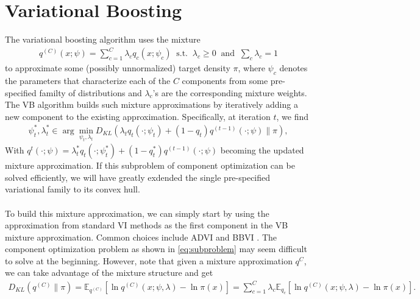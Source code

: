 

\section{Variational Boosting}\label{sec:vb}
The variational boosting algorithm uses the mixture
\begin{align*}
q^{(C)}(x;\psi) = \sum_{c=1}^C \lambda_c q_c(x; \psi_c) \ \text{ s.t. } \ \lambda_c \geq 0 \ \text{ and } \ \sum_{c}\lambda_c = 1
\end{align*}
to approximate some (possibly unnormalized) target density $\pi$, where $\psi_c$ denotes the parameters that characterize each of the $C$ components from some pre-specified familty of distributions and $\lambda_c$'s are the corresponding mixture weights. The VB algorithm builds such mixture approximations by iteratively adding a new component to the existing approximation. Specifically, at iteration $t$, we find
\begin{align}
\psi_t^*, \lambda_t^* \in \arg\min_{\psi_t, \lambda_t} D_{KL} \left( \lambda_t q_t(\cdot;\psi_t) + (1-q_t)q^{(t-1)}(\cdot;\psi) \| \pi \right),
\label{eq:subproblem}
\end{align}
With $q^{t}(\cdot;\psi) = \lambda_t^* q_t(\cdot;\psi_t^*) + (1-q_t^*)q^{(t-1)}(\cdot;\psi)$ becoming the updated mixture approximation. If this subproblem of component optimization can be solved efficiently, we will have greatly exdended the single pre-specified variational family to its convex hull.\\\\
To build this mixture approximation, we can simply start by using the approximation from standard VI methods as the first component in the VB mixture approximation. Common choices include ADVI and BBVI \cite{ranganath2014black,kucukelbir2017automatic}. The component optimization problem as shown in \cref{eq:subproblem} may seem difficult to solve at the beginning. However, note that given a mixture approximation $q^{C}$, we can take advantage of the mixture structure and get
\begin{align}\label{eq:component.wise}
D_{KL} \left( q^{(C)} \| \pi \right) = \mathbb{E}_{q^{(C)}} \left[ \ln q^{(C)}(x;\psi,\lambda) - \ln\pi(x) \right] = \sum_{c=1}^C \lambda_c \mathbb{E}_{q_c} \left[ \ln q^{(C)}(x;\psi,\lambda) - \ln\pi(x) \right].
\end{align}
